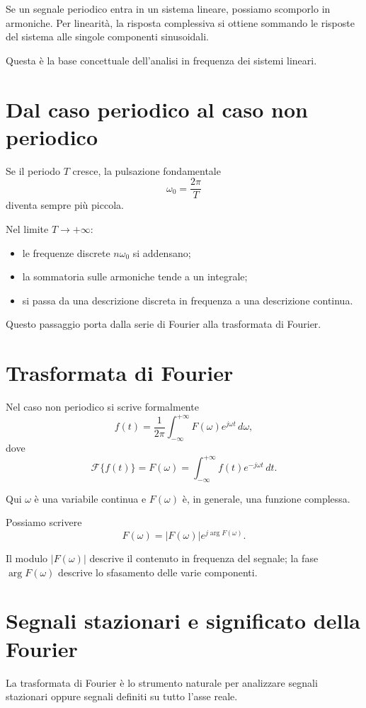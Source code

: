 Se un segnale periodico entra in un sistema lineare, possiamo scomporlo in armoniche.
Per linearità, la risposta complessiva si ottiene sommando le risposte del sistema
alle singole componenti sinusoidali.

Questa è la base concettuale dell'analisi in frequenza dei sistemi lineari.

\section{Dal caso periodico al caso non periodico}

Se il periodo \(T\) cresce, la pulsazione fondamentale
\[
\omega_0=\frac{2\pi}{T}
\]
diventa sempre più piccola.

Nel limite \(T\to+\infty\):
\begin{itemize}
    \item le frequenze discrete \(n\omega_0\) si addensano;
    \item la sommatoria sulle armoniche tende a un integrale;
    \item si passa da una descrizione discreta in frequenza a una descrizione continua.
\end{itemize}

Questo passaggio porta dalla serie di Fourier alla trasformata di Fourier.

\section{Trasformata di Fourier}

Nel caso non periodico si scrive formalmente
\[
f(t)=\frac{1}{2\pi}\int_{-\infty}^{+\infty} F(\omega)e^{j\omega t}\,d\omega,
\]
dove
\[
\mathcal{F}\{f(t)\}=F(\omega)
=
\int_{-\infty}^{+\infty} f(t)e^{-j\omega t}\,dt.
\]

Qui \(\omega\) è una variabile continua e \(F(\omega)\) è, in generale, una funzione complessa.

Possiamo scrivere
\[
F(\omega)=|F(\omega)|e^{j\arg F(\omega)}.
\]

Il modulo \(|F(\omega)|\) descrive il contenuto in frequenza del segnale;
la fase \(\arg F(\omega)\) descrive lo sfasamento delle varie componenti.

\section{Segnali stazionari e significato della Fourier}

La trasformata di Fourier è lo strumento naturale per analizzare segnali stazionari
oppure segnali definiti su tutto l'asse reale.

